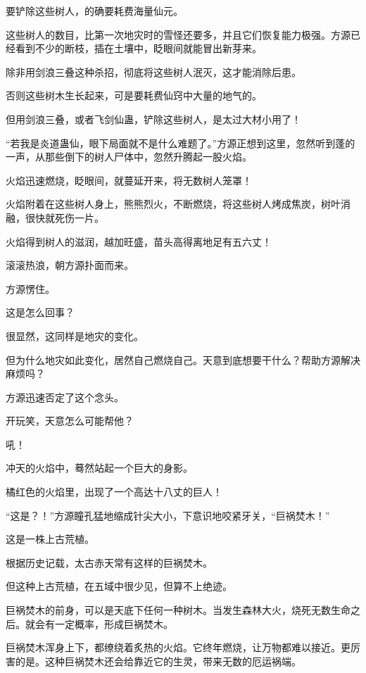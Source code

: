 
\begin{this_body}

要铲除这些树人，的确要耗费海量仙元。

这些树人的数目，比第一次地灾时的雪怪还要多，并且它们恢复能力极强。方源已经看到不少的断枝，插在土壤中，眨眼间就能冒出新芽来。

除非用剑浪三叠这种杀招，彻底将这些树人泯灭，这才能消除后患。

否则这些树木生长起来，可是要耗费仙窍中大量的地气的。

但用剑浪三叠，或者飞剑仙蛊，铲除这些树人，是太过大材小用了！

“若我是炎道蛊仙，眼下局面就不是什么难题了。”方源正想到这里，忽然听到蓬的一声，从那些倒下的树人尸体中，忽然升腾起一股火焰。

火焰迅速燃烧，眨眼间，就蔓延开来，将无数树人笼罩！

火焰附着在这些树人身上，熊熊烈火，不断燃烧，将这些树人烤成焦炭，树叶消融，很快就死伤一片。

火焰得到树人的滋润，越加旺盛，苗头高得离地足有五六丈！

滚滚热浪，朝方源扑面而来。

方源愣住。

这是怎么回事？

很显然，这同样是地灾的变化。

但为什么地灾如此变化，居然自己燃烧自己。天意到底想要干什么？帮助方源解决麻烦吗？

方源迅速否定了这个念头。

开玩笑，天意怎么可能帮他？

吼！

冲天的火焰中，蓦然站起一个巨大的身影。

橘红色的火焰里，出现了一个高达十八丈的巨人！

“这是？！”方源瞳孔猛地缩成针尖大小，下意识地咬紧牙关，“巨祸焚木！”

这是一株上古荒植。

根据历史记载，太古赤天常有这样的巨祸焚木。

但这种上古荒植，在五域中很少见，但算不上绝迹。

巨祸焚木的前身，可以是天底下任何一种树木。当发生森林大火，烧死无数生命之后。就会有一定概率，形成巨祸焚木。

巨祸焚木浑身上下，都缭绕着炙热的火焰。它终年燃烧，让万物都难以接近。更厉害的是。这种巨祸焚木还会给靠近它的生灵，带来无数的厄运祸端。


\end{this_body}

